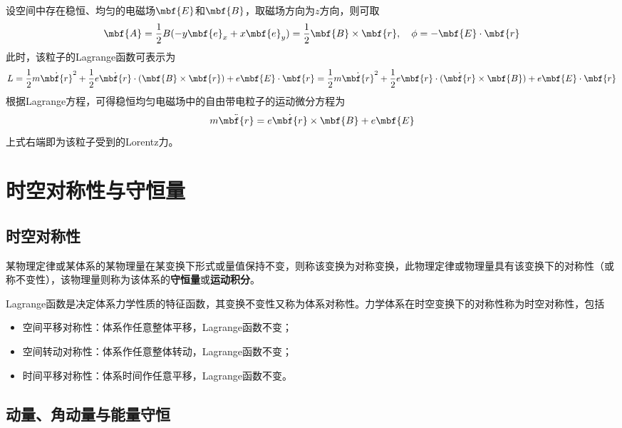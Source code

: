 \begin{example}[稳恒均匀电磁场中的自由带电粒子]
设空间中存在稳恒、均匀的电磁场$\mbf{E}$和$\mbf{B}$，取磁场方向为$z$方向，则可取
\begin{equation*}
	\mbf{A} = \frac12 B(-y\mbf{e}_x + x\mbf{e}_y) = \frac12 \mbf{B} \times \mbf{r},\quad \phi = -\mbf{E} \cdot \mbf{r}
\end{equation*}
此时，该粒子的Lagrange函数可表示为
\begin{equation*}
	L = \frac12 m\dot{\mbf{r}}^2 + \frac12 e\dot{\mbf{r}} \cdot (\mbf{B} \times \mbf{r}) + e\mbf{E} \cdot \mbf{r} = \frac12 m\dot{\mbf{r}}^2 + \frac12 e \mbf{r} \cdot (\dot{\mbf{r}} \times \mbf{B}) + e\mbf{E} \cdot \mbf{r} 
\end{equation*}
根据Lagrange方程，可得稳恒均匀电磁场中的自由带电粒子的运动微分方程为
\begin{equation*}
	m \ddot{\mbf{r}} = e\dot{\mbf{r}} \times \mbf{B} + e\mbf{E}
\end{equation*}
上式右端即为该粒子受到的Lorentz力。
\end{example}

\section{时空对称性与守恒量}

\subsection{时空对称性}

某物理定律或某体系的某物理量在某变换下形式或量值保持不变，则称该变换为{\heiti 对称变换}，此物理定律或物理量具有该变换下的{\heiti 对称性}（或称{\heiti 不变性}），该物理量则称为该体系的{\bf 守恒量}或{\bf 运动积分}。

Lagrange函数是决定体系力学性质的特征函数，其变换不变性又称为体系对称性。力学体系在时空变换下的对称性称为{\heiti 时空对称性}，包括
\begin{itemize}
	\item {\heiti 空间平移对称性}：体系作任意整体平移，Lagrange函数不变；
	\item {\heiti 空间转动对称性}：体系作任意整体转动，Lagrange函数不变；
	\item {\heiti 时间平移对称性}：体系时间作任意平移，Lagrange函数不变。
\end{itemize}

\subsection{动量、角动量与能量守恒}

